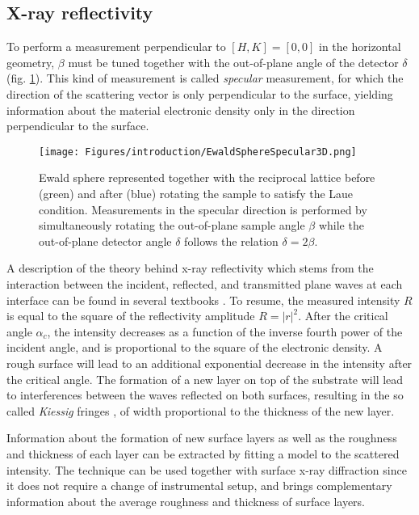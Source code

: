 \subsection{X-ray reflectivity}\label{sec:XRR}

To perform a measurement perpendicular to $[H, K] = [0, 0]$ in the horizontal geometry, $\beta$ must be tuned together with the out-of-plane angle of the detector $\delta$ (fig. \ref{fig:EwaldSphereSpecular}).
This kind of measurement is called \textit{specular} measurement, for which the direction of the scattering vector is only perpendicular to the surface, yielding information about the material electronic density only in the direction perpendicular to the surface.

\begin{figure}[!htb]
    \centering
    \texttt{[image: Figures/introduction/EwaldSphereSpecular3D.png]}
    \caption{
    Ewald sphere represented together with the reciprocal lattice before (green) and after (blue) rotating the sample to satisfy the Laue condition.
    Measurements in the specular direction is performed by simultaneously rotating the out-of-plane sample angle $\beta$ while the out-of-plane detector angle $\delta$ follows the relation $\delta=2\beta$.
    }
    \label{fig:EwaldSphereSpecular}
\end{figure}

A description of the theory behind x-ray reflectivity which stems from the interaction between the incident, reflected, and transmitted plane waves at each interface can be found in several textbooks \parencite{Willmott}.
To resume, the measured intensity $R$ is equal to the square of the reflectivity amplitude $R=|r|^2$.
After the critical angle $\alpha_c$, the intensity decreases as a function of the inverse fourth power of the incident angle, and is proportional to the square of the electronic density.
A rough surface will lead to an additional exponential decrease in the intensity after the critical angle.
The formation of a new layer on top of the substrate will lead to interferences between the waves reflected on both surfaces, resulting in the so called \textit{Kiessig} fringes \parencite{Kiessig1931}, of width proportional to the thickness of the new layer.

Information about the formation of new surface layers as well as the roughness and thickness of each layer can be extracted by fitting a model to the scattered intensity.
The technique can be used together with surface x-ray diffraction since it does not require a change of instrumental setup, and brings complementary information about the average roughness and thickness of surface layers.
